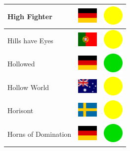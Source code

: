 \documentclass[12pt, a4paper, twoside]{report}
\begin{document}
\begin{center}
\begin{longtable}{|p{5cm}|p{2cm}|p{2cm}|}
High Fighter & \includegraphics[width=1cm]{4x3/de} & \includegraphics[width=1cm]{likes/m} \\ \hline
Hills have Eyes & \includegraphics[width=1cm]{4x3/pt} & \includegraphics[width=1cm]{likes/m} \\ \hline
Hollowed & \includegraphics[width=1cm]{4x3/de} & \includegraphics[width=1cm]{likes/y} \\ \hline
Hollow World & \includegraphics[width=1cm]{4x3/au} & \includegraphics[width=1cm]{likes/m} \\ \hline
Horisont & \includegraphics[width=1cm]{4x3/se} & \includegraphics[width=1cm]{likes/m} \\ \hline
Horns of Domination & \includegraphics[width=1cm]{4x3/de} & \includegraphics[width=1cm]{likes/y} \\ \hline

\end{longtable}
\end{center}
\end{document}
